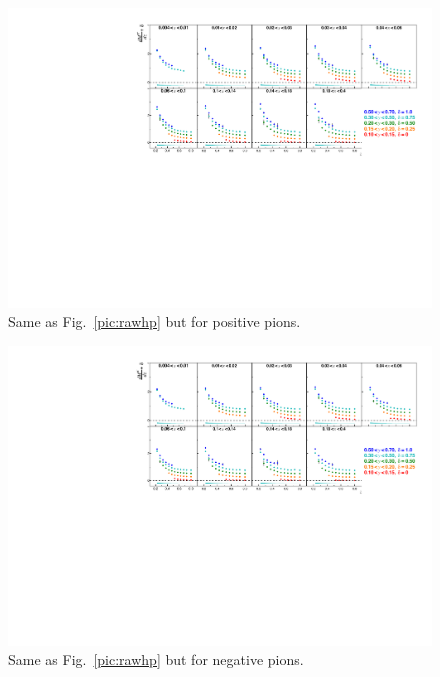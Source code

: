 \begin{figure}[!h]
  \includegraphics[scale=0.85]{./gfx/rawpip.pdf}
  \caption{Same as Fig.~\ref{pic:rawhp} but for positive pions.}
  \label{pic:rawpip}
\end{figure}

\newpage

\begin{figure}[!h]
  \includegraphics[scale=0.85]{./gfx/rawpim.pdf}
  \caption{Same as Fig.~\ref{pic:rawhp} but for negative pions.}
  \label{pic:rawpim}
\end{figure}

